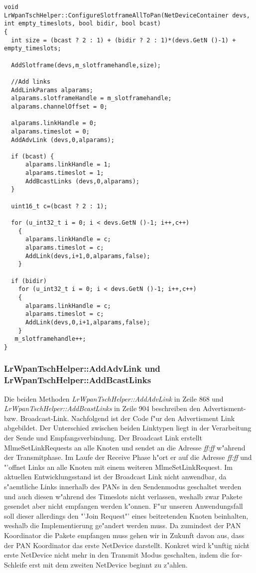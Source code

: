 \begin{lstlisting}[frame=single]
void
LrWpanTschHelper::ConfigureSlotframeAllToPan(NetDeviceContainer devs, int empty_timeslots, bool bidir, bool bcast)
{
  int size = (bcast ? 2 : 1) + (bidir ? 2 : 1)*(devs.GetN ()-1) + empty_timeslots;

  AddSlotframe(devs,m_slotframehandle,size);

  //Add links
  AddLinkParams alparams;
  alparams.slotframeHandle = m_slotframehandle;
  alparams.channelOffset = 0;

  alparams.linkHandle = 0;
  alparams.timeslot = 0;
  AddAdvLink (devs,0,alparams);

  if (bcast) {
	  alparams.linkHandle = 1;
	  alparams.timeslot = 1;
	  AddBcastLinks (devs,0,alparams);
  }

  uint16_t c=(bcast ? 2 : 1);

  for (u_int32_t i = 0; i < devs.GetN ()-1; i++,c++)
    {
      alparams.linkHandle = c;
      alparams.timeslot = c;
      AddLink(devs,i+1,0,alparams,false);
    }

  if (bidir)
    for (u_int32_t i = 0; i < devs.GetN ()-1; i++,c++)
    {
      alparams.linkHandle = c;
      alparams.timeslot = c;
      AddLink(devs,0,i+1,alparams,false);
    }
   m_slotframehandle++;
}
\end{lstlisting}

\subsubsection{LrWpanTschHelper::AddAdvLink und LrWpanTschHelper::AddBcastLinks}

Die beiden Methoden \textit{LrWpanTschHelper::AddAdvLink} in Zeile 868 und
\textit{LrWpanTschHelper::AddBcastLinks} in Zeile 904 beschreiben den
Advertisment- bzw. Broadcast-Link. Nachfolgend ist der Code f"ur den Advertisment
Link abgebildet. Der Unterschied zwischen beiden Linktypen liegt in der Verarbeitung
der Sende und Empfangsverbindung.
Der Broadcast Link erstellt MlmeSetLinkRequests an alle Knoten und sendet an die
Adresse \textit{ff:ff} w"ahrend der Transmitphase. Im Laufe der Receive Phase
h"ort er auf die Adresse \textit{ff:ff} und "'offnet Links an alle Knoten mit einem
weiteren MlmeSetLinkRequest. Im aktuellen Entwicklungsstand ist der Broadcast Link
nicht anwendbar, da s"aemtliche Links innerhalb des PANs in den Sendenmodus geschaltet werden
und auch diesen w"ahrend des Timeslots nicht verlassen, weshalb zwar Pakete gesendet
aber nicht empfangen werden k"onnen.
F"ur unseren Anwendungsfall soll dieser allerdings den "'Join Request"' eines
beitretenden Knoten beinhalten, weshalb die Implementierung ge"andert werden muss.
Da zumindest der PAN Koordinator die Pakete empfangen muss gehen wir in Zukunft
davon aus, dass der PAN Koordinator das erste NetDevice darstellt. Konkret wird k"unftig
nicht erste NetDevice nicht mehr in den Transmit Modus geschalten, indem die for-Schleife
erst mit dem zweiten NetDevice beginnt zu z"ahlen.

